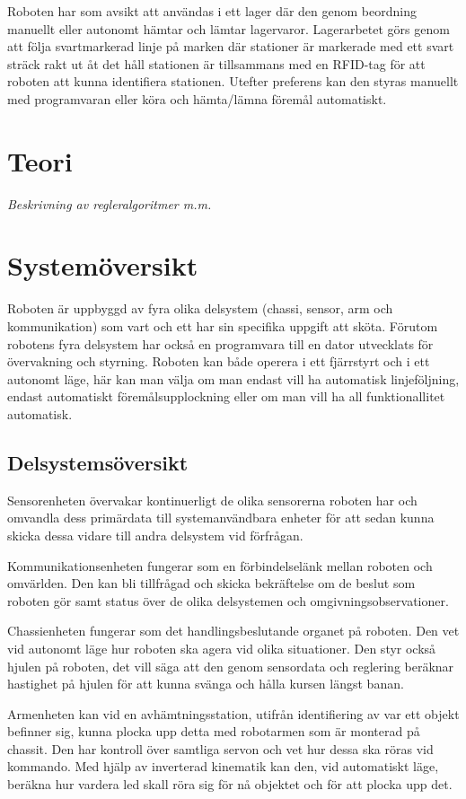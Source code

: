 \documentclass[a4paper,12pt]{article}
\begin{document}
Roboten har som avsikt att användas i ett lager där den genom beordning manuellt eller autonomt hämtar och lämtar lagervaror. Lagerarbetet görs genom att följa svartmarkerad linje på marken där stationer är markerade med ett svart sträck rakt ut åt det håll stationen är tillsammans med en RFID-tag för att roboten att kunna identifiera stationen. Utefter preferens kan den styras manuellt med programvaran eller köra och hämta/lämna föremål automatiskt.

\section{Teori}
\emph{Beskrivning av regleralgoritmer m.m.}

\section{Systemöversikt}
Roboten är uppbyggd av fyra olika delsystem (chassi, sensor, arm och kommunikation) som vart och ett har sin specifika uppgift att sköta. Förutom robotens fyra delsystem har också en programvara till en dator utvecklats för övervakning och styrning. Roboten kan både operera i ett fjärrstyrt och i ett autonomt läge, här kan man välja om man endast vill ha automatisk linjeföljning, endast automatiskt föremålsupplockning eller om man vill ha all funktionallitet automatisk.

\subsection{Delsystemsöversikt}
Sensorenheten övervakar kontinuerligt de olika sensorerna roboten har och omvandla dess primärdata till systemanvändbara enheter för att sedan kunna skicka dessa vidare till andra delsystem vid förfrågan.

Kommunikationsenheten fungerar som en förbindelselänk mellan roboten och omvärlden. Den kan bli tillfrågad och skicka bekräftelse om de beslut som roboten gör samt status över de olika delsystemen och omgivningsobservationer.

Chassienheten fungerar som det handlingsbeslutande organet på roboten. Den vet vid autonomt läge hur roboten ska agera vid olika situationer. Den styr också hjulen på roboten, det vill säga att den genom sensordata och reglering beräknar hastighet på hjulen för att kunna svänga och hålla kursen längst banan.

Armenheten kan vid en avhämtningsstation, utifrån identifiering av var ett objekt befinner sig, kunna plocka upp detta med robotarmen som är monterad på chassit. Den har kontroll över samtliga servon och vet hur dessa ska röras vid kommando. Med hjälp av inverterad kinematik kan den, vid automatiskt läge, beräkna hur vardera led skall röra sig för nå objektet och för att plocka upp det.
\end{document}
